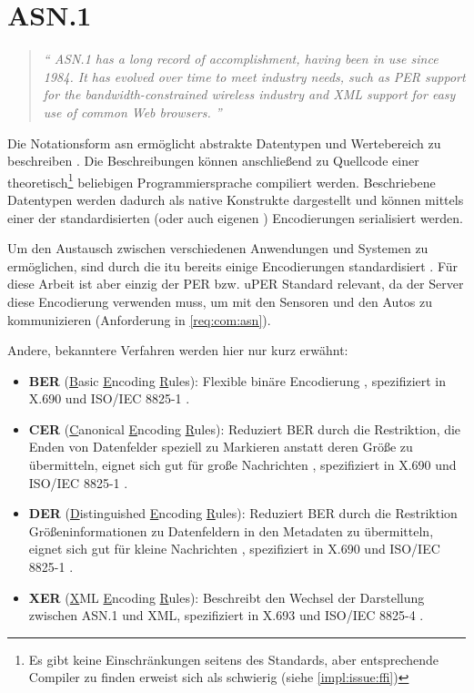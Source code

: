 
\section{ASN.1}

\begin{quotation}
	\textit{\enquote{
			ASN.1 has a long record of accomplishment, having been in use since 1984. It has evolved over time to meet industry needs, such as PER support for the bandwidth-constrained wireless industry and XML support for easy use of common Web browsers.
		}}
	\cite{asn:itu:asn.1}
\end{quotation}

Die Notationsform \gls{asn} ermöglicht abstrakte Datentypen und Wertebereich zu beschreiben \cite{asn:layman}.
Die Beschreibungen können anschließend zu Quellcode einer theoretisch\footnote{Es gibt keine Einschränkungen seitens des Standards, aber entsprechende Compiler zu finden erweist sich als schwierig (siehe \autoref{impl:issue:ffi})} beliebigen Programmiersprache compiliert werden.
Beschriebene Datentypen werden dadurch als native Konstrukte dargestellt und können mittels einer der standardisierten (oder auch eigenen \cite{asn:itu:ecn}) Encodierungen serialisiert werden.

Um den Austausch zwischen verschiedenen Anwendungen und Systemen zu ermöglichen, sind durch die \gls{itu}  bereits einige Encodierungen standardisiert \cite[8]{asn:itu:x691}.
Für diese Arbeit ist aber einzig der PER bzw. uPER Standard relevant, da der Server diese Encodierung verwenden muss, um mit den Sensoren und den Autos zu kommunizieren (Anforderung in \autoref{req:com:asn}).

Andere, bekanntere Verfahren werden hier nur kurz erwähnt:
\begin{itemize}
	\item \textbf{BER} (\underline{B}asic \underline{E}ncoding \underline{R}ules): Flexible binäre Encodierung \cite{asn:wiki:x690}, spezifiziert in X.690 \cite{asn:itu:x690} und ISO/IEC 8825-1 \cite{asn:iso}.
	\item \textbf{CER} (\underline{C}anonical \underline{E}ncoding \underline{R}ules): Reduziert BER durch die Restriktion, die Enden von Datenfelder speziell zu Markieren anstatt deren Größe zu übermitteln, eignet sich gut für große Nachrichten \cite{asn:wiki:x690}, spezifiziert in X.690 \cite{asn:itu:x690} und ISO/IEC 8825-1 \cite{asn:iso}.
	\item \textbf{DER} (\underline{D}istinguished \underline{E}ncoding \underline{R}ules): Reduziert BER durch die Restriktion Größeninformationen zu Datenfeldern in den Metadaten zu übermitteln, eignet sich gut für kleine Nachrichten \cite{asn:wiki:x690}, spezifiziert in X.690 \cite{asn:itu:x690} und ISO/IEC 8825-1 \cite{asn:iso}.
	\item \textbf{XER} (\underline{X}ML \underline{E}ncoding \underline{R}ules): Beschreibt den Wechsel der Darstellung zwischen ASN.1 und XML, spezifiziert in X.693 \cite{asn:itu:x693} und ISO/IEC 8825-4 \cite{asn:iso}.
\end{itemize}

